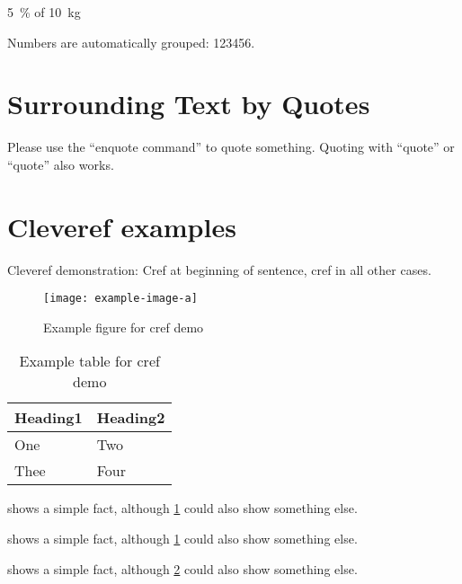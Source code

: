 \documentclass[
  fontsize=10pt
  numbers=noenddot,
  english,  %
  paper=a5,
  twoside,  %
  DIV=calc,
  headings=small,
  bibliography=totoc,
  listof=totoc,
  draft=false
]{scrbook}
\theoremstyle{break}
\begin{document}
\begin{ltgexample}
\SI{5}{\percent} of \SI{10}{kg}
\end{ltgexample}

\begin{ltgexample}
Numbers are automatically grouped: \num{123456}.
\end{ltgexample}

\section{Surrounding Text by Quotes}

\begin{ltgexample}
Please use the \enquote{enquote command} to quote something.
Quoting with "`quote"' or ``quote'' also works.

\end{ltgexample}

\section{Cleveref examples}
\label{sec:ex:cref}

Cleveref demonstration: Cref at beginning of sentence, cref in all other cases.

\begin{figure}
    \centering
    \texttt{[image: example-image-a]}
    \caption{Example figure for cref demo}
    \label{fig:ex:cref}
\end{figure}

\begin{table}
    \centering
    \begin{tabular}{ll}
      \toprule
      Heading1 & Heading2 \\
      \midrule
      One      & Two      \\
      Thee     & Four     \\
      \bottomrule
    \end{tabular}
    \caption{Example table for cref demo}
    \label{tab:ex:cref}
\end{table}

\begin{ltgexample}
 shows a simple fact, although \cref{fig:ex:cref} could also show something else.

 shows a simple fact, although \cref{tab:ex:cref} could also show something else.

 shows a simple fact, although \cref{sec:ex:cref} could also show something else.
\end{ltgexample}
\end{document}
